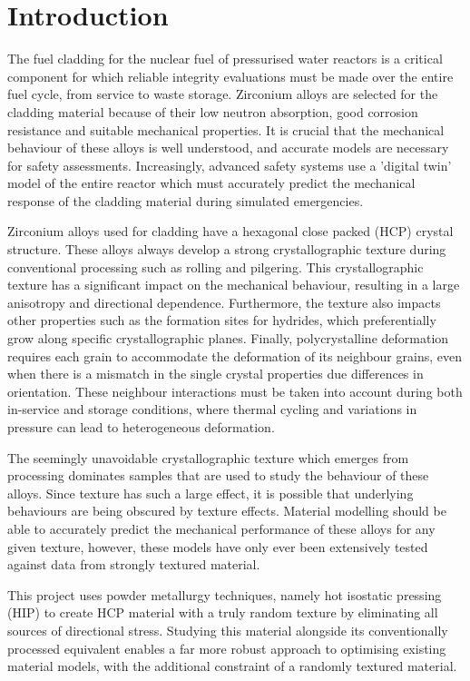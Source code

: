 \chapter{Introduction}

The fuel cladding for the nuclear fuel of pressurised water reactors is a critical component for which reliable integrity evaluations must be made over the entire fuel cycle, from service to waste storage.
Zirconium alloys are selected for the cladding material because of their low neutron absorption, good corrosion resistance and suitable mechanical properties.
It is crucial that the mechanical behaviour of these alloys is well understood, and accurate models are necessary for safety assessments.
Increasingly, advanced safety systems use a 'digital twin' model of the entire reactor which must accurately predict the mechanical response of the cladding material during simulated emergencies.

Zirconium alloys used for cladding have a hexagonal close packed (HCP) crystal structure.
These alloys always develop a strong crystallographic texture during conventional processing such as rolling and pilgering.
This crystallographic texture has a significant impact on the mechanical behaviour, resulting in a large anisotropy and directional dependence.
Furthermore, the texture also impacts other properties such as the formation sites for hydrides, which preferentially grow along specific crystallographic planes.
Finally, polycrystalline deformation requires each grain to accommodate the deformation of its neighbour grains, even when there is a mismatch in the single crystal properties due differences in orientation.
These neighbour interactions must be taken into account during both in-service and storage conditions, where thermal cycling and variations in pressure can lead to heterogeneous deformation.

The seemingly unavoidable crystallographic texture which emerges from processing dominates samples that are used to study the behaviour of these alloys.
Since texture has such a large effect, it is possible that underlying behaviours are being obscured by texture effects.
Material modelling should be able to accurately predict the mechanical performance of these alloys for any given texture, however, these models have only ever been extensively tested against data from strongly textured material.

This project uses powder metallurgy techniques, namely hot isostatic pressing (HIP) to create HCP material with a truly random texture by eliminating all sources of directional stress.
Studying this material alongside its conventionally processed equivalent enables a far more robust approach to optimising existing material models, with the additional constraint of a randomly textured material.

